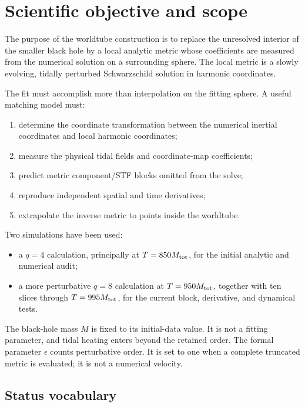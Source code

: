 \documentclass[11pt]{article}
\newcommand{\eps}{\epsilon}
\begin{document}
\tableofcontents
\clearpage

\section{Scientific objective and scope}

The purpose of the worldtube construction is to replace the unresolved
interior of the smaller black hole by a local analytic metric whose
coefficients are measured from the numerical solution on a surrounding
sphere.  The local metric is a slowly evolving, tidally perturbed
Schwarzschild solution in harmonic coordinates.

The fit must accomplish more than interpolation on the fitting sphere.  A
useful matching model must:

\begin{enumerate}
  \item determine the coordinate transformation between the numerical
        inertial coordinates and local harmonic coordinates;
  \item measure the physical tidal fields and coordinate-map coefficients;
  \item predict metric component/STF blocks omitted from the solve;
  \item reproduce independent spatial and time derivatives;
  \item extrapolate the inverse metric to points inside the worldtube.
\end{enumerate}

Two simulations have been used:

\begin{itemize}
  \item a \(q=4\) calculation, principally at
        \(T=850M_{\rm tot}\), for the initial analytic and numerical audit;
  \item a more perturbative \(q=8\) calculation at
        \(T=950M_{\rm tot}\), together with ten slices through
        \(T=995M_{\rm tot}\), for the current block, derivative, and
        dynamical tests.
\end{itemize}

The black-hole mass \(M\) is fixed to its initial-data value.  It is not a
fitting parameter, and tidal heating enters beyond the retained order.  The
formal parameter \(\eps\) counts perturbative order.  It is set to one when a
complete truncated metric is evaluated; it is not a numerical velocity.

\subsection{Status vocabulary}
\end{document}
